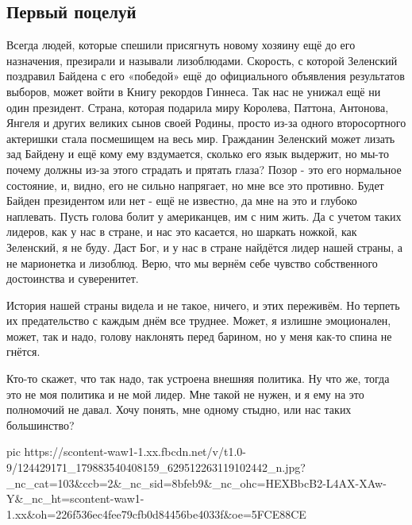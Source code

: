  
 
 

\subsection{Первый поцелуй}

Всегда людей, которые спешили присягнуть новому хозяину ещё до его назначения,
презирали и называли лизоблюдами. Скорость, с которой Зеленский поздравил
Байдена с его «победой» ещё до официального объявления результатов выборов,
может войти в Книгу рекордов Гиннеса. Так нас не унижал ещё ни один президент.
Страна, которая подарила миру Королева, Паттона, Антонова, Янгеля и других
великих сынов своей Родины, просто из-за одного второсортного актеришки стала
посмешищем на весь мир. Гражданин Зеленский может лизать зад Байдену и ещё кому
ему вздумается, сколько его язык выдержит, но мы-то почему должны из-за этого
страдать и прятать глаза? Позор - это его нормальное состояние, и, видно, его
не сильно напрягает, но мне все это противно. Будет Байден президентом или нет
- ещё не известно, да мне на это и глубоко наплевать. Пусть голова болит у
американцев, им с ним жить. Да с учетом таких лидеров, как у нас в стране, и
нас это касается, но шаркать ножкой, как Зеленский, я не буду. Даст Бог, и у
нас в стране найдётся лидер нашей страны, а не марионетка и лизоблюд.  Верю,
что мы вернём себе чувство собственного достоинства и суверенитет. 

История нашей страны видела и не такое, ничего, и этих переживём. Но терпеть их
предательство с каждым днём все труднее.  Может, я излишне эмоционален, может,
так и надо, голову наклонять перед барином, но у меня как-то спина не гнётся.

Кто-то скажет, что так надо, так устроена внешняя политика. Ну что же, тогда
это не моя политика и не мой лидер. Мне такой не нужен, и я ему на это
полномочий не давал. Хочу понять, мне одному стыдно, или нас таких большинство?

\ifcmt
pic https://scontent-waw1-1.xx.fbcdn.net/v/t1.0-9/124429171_179883540408159_629512263119102442_n.jpg?_nc_cat=103&ccb=2&_nc_sid=8bfeb9&_nc_ohc=HEXBbcB2-L4AX-XAw-Y&_nc_ht=scontent-waw1-1.xx&oh=226f536ec4fee79cfb0d84456be4033f&oe=5FCE88CE
\fi
